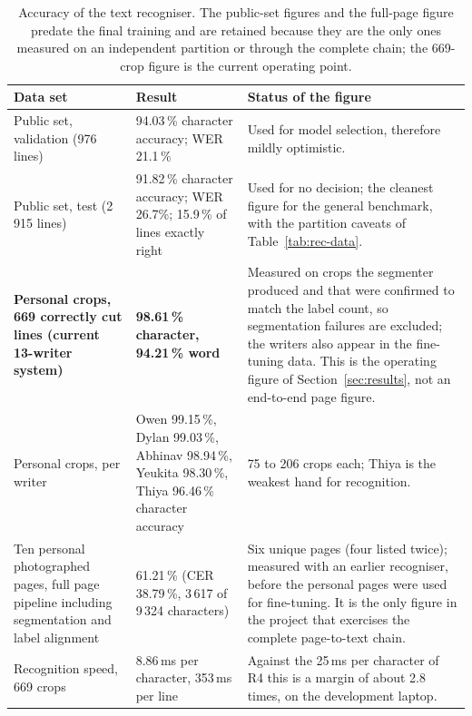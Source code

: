 \begin{table}[h]
\centering
\fontsize{9.5}{11.5}\selectfont
\begin{tabularx}{\linewidth}{|p{3.7cm}|p{2.7cm}|X|}
\hline
\textbf{Data set} & \textbf{Result} & \textbf{Status of the figure} \\
\hline
Public set, validation (976 lines) & 94.03\,\% character accuracy; WER 21.1\,\% & Used for model selection, therefore mildly optimistic. \\
\hline
Public set, test (2\,915 lines) & 91.82\,\% character accuracy; WER 26.7\%; 15.9\,\% of lines exactly right & Used for no decision; the cleanest figure for the general benchmark, with the partition caveats of Table~\ref{tab:rec-data}. \\
\hline
\textbf{Personal crops, 669 correctly cut lines (current 13-writer system)} & \textbf{98.61\,\% character, 94.21\,\% word} & Measured on crops the segmenter produced and that were confirmed to match the label count, so segmentation failures are excluded; the writers also appear in the fine-tuning data. This is the operating figure of Section~\ref{sec:results}, not an end-to-end page figure. \\
\hline
Personal crops, per writer & Owen 99.15\,\%, Dylan 99.03\,\%, Abhinav 98.94\,\%, Yeukita 98.30\,\%, Thiya 96.46\,\% character accuracy & 75 to 206 crops each; Thiya is the weakest hand for recognition. \\
\hline
Ten personal photographed pages, full page pipeline including segmentation and label alignment & 61.21\,\% (CER 38.79\,\%, 3\,617 of 9\,324 characters) & Six unique pages (four listed twice); measured with an earlier recogniser, before the personal pages were used for fine-tuning. It is the only figure in the project that exercises the complete page-to-text chain. \\
\hline
Recognition speed, 669 crops & 8.86\,ms per character, 353\,ms per line & Against the 25\,ms per character of R4 this is a margin of about 2.8 times, on the development laptop. \\
\hline
\end{tabularx}
\caption{Accuracy of the text recogniser. The public-set figures and the full-page figure predate the final training and are retained because they are the only ones measured on an independent partition or through the complete chain; the 669-crop figure is the current operating point.}
\label{tab:rec-results}
\end{table}


